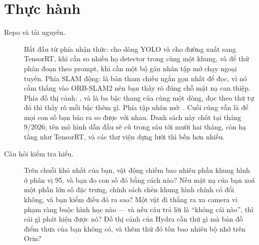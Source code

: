 \documentclass[../../deep_learning.tex]{subfiles}
\begin{document}
\section{Thực hành}
\begin{description}
\item[Repo và tài nguyên.] Bắt đầu từ phía nhận thức:  cho dòng YOLO và cho đường xuất sang TensorRT,  khi cần so nhiều họ detector trong cùng một khung,  và  để thử phân đoạn theo prompt,  khi cần một bộ gán nhãn tập mở chạy ngoại tuyến. Phía SLAM động:  là bản tham chiếu ngắn gọn nhất để đọc, vì nó cắm thẳng vào ORB-SLAM2 nên bạn thấy rõ đúng chỗ mặt nạ can thiệp. Phía đồ thị cảnh: ,  và  là ba bậc thang của cùng một dòng, đọc theo thứ tự đó thì thấy rõ mỗi bậc thêm gì. Phía tập nhãn mở: . Cuối cùng vẫn là  để mọi con số bạn báo ra so được với nhau. Danh sách này chốt tại tháng 9/2026; tên mô hình dẫn đầu sẽ cũ trong sáu tới mười hai tháng, còn hạ tầng như TensorRT,  và các thư viện dựng lưới thì bền hơn nhiều.
\item[Câu hỏi kiểm tra hiểu.] Trên chuỗi khó nhất của bạn, vật động chiếm bao nhiêu phần khung hình ở phân vị 95, và bạn đo con số đó bằng cách nào? Nếu mặt nạ của bạn xoá một phần lớn số đặc trưng, chính sách chèn khung hình chính có đổi không, và bạn kiểm điều đó ra sao? Một vật đi thẳng ra xa camera vi phạm ràng buộc hình học nào --- và nếu câu trả lời là ``không cái nào'', thì cái gì phát hiện được nó? Đồ thị cảnh của Hydra cần thứ gì mà bản đồ điểm thưa của bạn không có, và thêm thứ đó tốn bao nhiêu bộ nhớ trên Orin?
\end{description}
\end{document}
